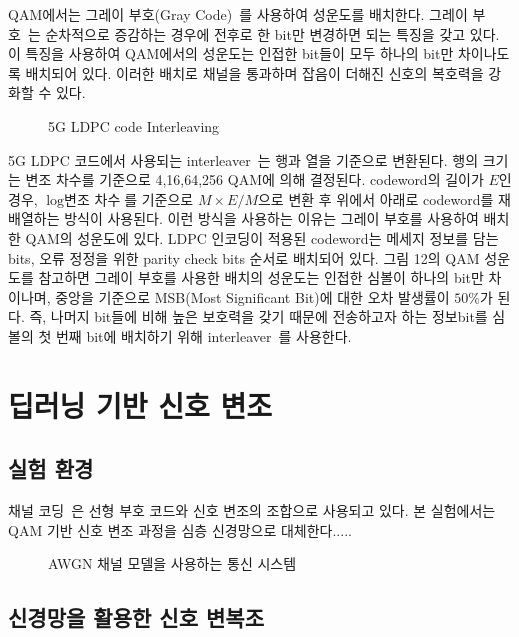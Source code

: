 \documentclass[11pt]{oblivoir}
\begin{document}
QAM에서는 그레이 부호(Gray Code)~\cite{doran2007gray}를 사용하여 성운도를 배치한다. 그레이 부호~\cite{doran2007gray}는 순차적으로 증감하는 경우에 전후로 한 bit만 변경하면 되는 특징을 갖고 있다. 이 특징을 사용하여 QAM에서의 성운도는 인접한 bit들이 모두 하나의 bit만 차이나도록 배치되어 있다. 이러한 배치로 채널을 통과하며 잡음이 더해진 신호의 복호력을 강화할 수 있다.

\begin{figure}[h!]
\footnotesize
\centering
\DrawInterleaving
\caption{5G  LDPC code Interleaving}
\label{fig:system}
\end{figure}

5G LDPC 코드에서 사용되는 interleaver~\cite{bae2019overview}는 행과 열을 기준으로 변환된다. 행의 크기는 변조 차수를 기준으로 4,16,64,256 QAM에 의해 결정된다. codeword의 길이가 $E$인 경우, $\log \text{변조 차수}$를 기준으로 $M \times E/M$으로 변환 후 위에서 아래로 codeword를 재배열하는 방식이 사용된다. 이런 방식을 사용하는 이유는 그레이 부호를 사용하여 배치한 QAM의 성운도에 있다. LDPC 인코딩이 적용된 codeword는 메세지 정보를 담는 bits, 오류 정정을 위한 parity check bits 순서로 배치되어 있다. 그림 12의 QAM 성운도를 참고하면 그레이 부호를 사용한 배치의 성운도는 인접한 심볼이 하나의 bit만 차이나며, 중앙을 기준으로 MSB(Most Significant Bit)에 대한 오차 발생률이 $50 \%$가 된다. 즉, 나머지 bit들에 비해 높은 보호력을 갖기 때문에 전송하고자 하는 정보bit를 심볼의 첫 번째 bit에 배치하기 위해 interleaver~\cite{bae2019overview}를 사용한다.

\newpage

\section{\centering 딥러닝 기반 신호 변조}

\subsection{실험 환경}

채널 코딩~\cite{faruque2016introduction}은 선형 부호 코드와 신호 변조의 조합으로 사용되고 있다. 본 실험에서는 QAM 기반 신호 변조 과정을 심층 신경망으로 대체한다.....

\begin{figure}[h!]
\footnotesize
\centering
\DrawCommunicationSystem
\caption{AWGN 채널 모델을 사용하는 통신 시스템}
\label{fig:system}
\end{figure}

\subsection{신경망을 활용한 신호 변복조}
\end{document}
